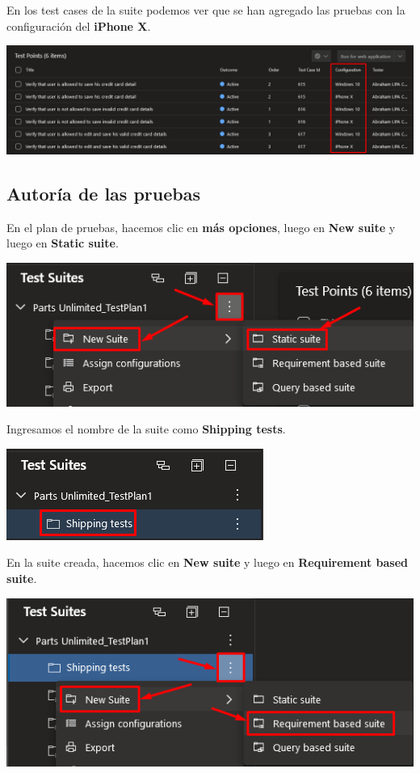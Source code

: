 \documentclass{elsarticle}
\begin{document}
En los test cases de la suite podemos ver que se han agregado las pruebas con la configuración del \textbf{iPhone X}.
\begin{center}
	\includegraphics[width=\columnwidth]{img/Screenshot_46.png}
\end{center}

\subsection{Autoría de las pruebas}

En el plan de pruebas, hacemos clic en \textbf{más opciones}, luego en \textbf{New suite} y luego en \textbf{Static suite}.
\begin{center}
	\includegraphics[width=\columnwidth]{img/Screenshot_47.png}
\end{center}

Ingresamos el nombre de la suite como \textbf{Shipping tests}.
\begin{center}
	\includegraphics{img/Screenshot_48.png}
\end{center}

En la suite creada, hacemos clic en \textbf{New suite} y luego en \textbf{Requirement based suite}.
\begin{center}
	\includegraphics[width=\columnwidth]{img/Screenshot_49.png}
\end{center}
\end{document}

